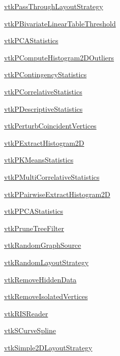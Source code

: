 \begin{DoxyItemize}
\item \hyperlink{vtkinfovis_vtkpassthroughlayoutstrategy}{vtk\-Pass\-Through\-Layout\-Strategy}  
\item \hyperlink{vtkinfovis_vtkpbivariatelineartablethreshold}{vtk\-P\-Bivariate\-Linear\-Table\-Threshold}  
\item \hyperlink{vtkinfovis_vtkpcastatistics}{vtk\-P\-C\-A\-Statistics}  
\item \hyperlink{vtkinfovis_vtkpcomputehistogram2doutliers}{vtk\-P\-Compute\-Histogram2\-D\-Outliers}  
\item \hyperlink{vtkinfovis_vtkpcontingencystatistics}{vtk\-P\-Contingency\-Statistics}  
\item \hyperlink{vtkinfovis_vtkpcorrelativestatistics}{vtk\-P\-Correlative\-Statistics}  
\item \hyperlink{vtkinfovis_vtkpdescriptivestatistics}{vtk\-P\-Descriptive\-Statistics}  
\item \hyperlink{vtkinfovis_vtkperturbcoincidentvertices}{vtk\-Perturb\-Coincident\-Vertices}  
\item \hyperlink{vtkinfovis_vtkpextracthistogram2d}{vtk\-P\-Extract\-Histogram2\-D}  
\item \hyperlink{vtkinfovis_vtkpkmeansstatistics}{vtk\-P\-K\-Means\-Statistics}  
\item \hyperlink{vtkinfovis_vtkpmulticorrelativestatistics}{vtk\-P\-Multi\-Correlative\-Statistics}  
\item \hyperlink{vtkinfovis_vtkppairwiseextracthistogram2d}{vtk\-P\-Pairwise\-Extract\-Histogram2\-D}  
\item \hyperlink{vtkinfovis_vtkppcastatistics}{vtk\-P\-P\-C\-A\-Statistics}  
\item \hyperlink{vtkinfovis_vtkprunetreefilter}{vtk\-Prune\-Tree\-Filter}  
\item \hyperlink{vtkinfovis_vtkrandomgraphsource}{vtk\-Random\-Graph\-Source}  
\item \hyperlink{vtkinfovis_vtkrandomlayoutstrategy}{vtk\-Random\-Layout\-Strategy}  
\item \hyperlink{vtkinfovis_vtkremovehiddendata}{vtk\-Remove\-Hidden\-Data}  
\item \hyperlink{vtkinfovis_vtkremoveisolatedvertices}{vtk\-Remove\-Isolated\-Vertices}  
\item \hyperlink{vtkinfovis_vtkrisreader}{vtk\-R\-I\-S\-Reader}  
\item \hyperlink{vtkinfovis_vtkscurvespline}{vtk\-S\-Curve\-Spline}  
\item \hyperlink{vtkinfovis_vtksimple2dlayoutstrategy}{vtk\-Simple2\-D\-Layout\-Strategy}  

\end{DoxyItemize}
